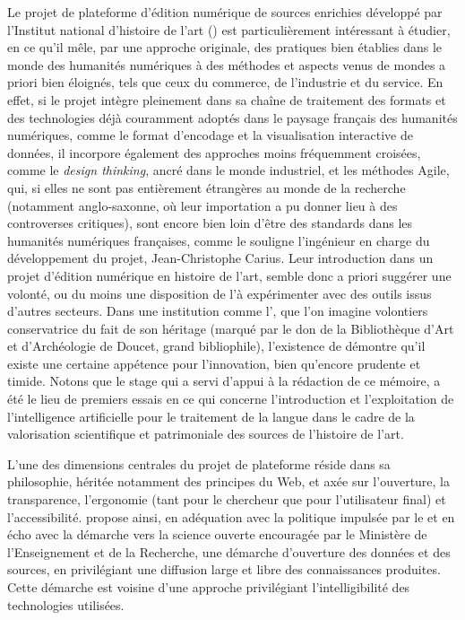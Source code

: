 Le projet de plateforme d’édition numérique de sources enrichies développé par l’Institut national d’histoire de l’art (\inha) est particulièrement intéressant à étudier, en ce qu’il mêle, par une approche originale, des pratiques bien établies dans le monde des humanités numériques à des méthodes et aspects venus de mondes a priori bien éloignés, tels que ceux du commerce, de l’industrie et du service. En effet, si le projet intègre pleinement dans sa chaîne de traitement des formats et des technologies déjà couramment adoptés dans le paysage français des humanités numériques, comme le format d’encodage \tei et la visualisation interactive de données, il incorpore également des approches moins fréquemment croisées, comme le \textit{design thinking}, ancré dans le monde industriel, et les méthodes Agile, qui, si elles ne sont pas entièrement étrangères au monde de la recherche (notamment anglo-saxonne, où leur importation a pu donner lieu à des controverses critiques), sont encore bien loin d’être des standards dans les humanités numériques françaises, comme le souligne l’ingénieur en charge du développement du projet, Jean-Christophe Carius. Leur introduction dans un projet d’édition numérique en histoire de l’art, semble donc a priori suggérer une volonté, ou du moins une disposition de l'\inha à expérimenter avec des outils issus d’autres secteurs. Dans une institution comme l’\inha, que l’on imagine volontiers conservatrice du fait de son héritage (marqué par le don de la Bibliothèque d’Art et d’Archéologie de Doucet, grand bibliophile), l’existence de \pense démontre qu’il existe une certaine appétence pour l’innovation, bien qu’encore prudente et timide. Notons que le stage qui a servi d’appui à la rédaction de ce mémoire, a été le lieu de premiers essais en ce qui concerne l’introduction et l’exploitation de l’intelligence artificielle pour le traitement de la langue dans le cadre de la valorisation scientifique et patrimoniale des sources de l’histoire de l’art. 

L’une des dimensions centrales du projet de plateforme \pense réside dans sa philosophie, héritée notamment des principes du Web, et axée sur l’ouverture, la transparence, l’ergonomie (tant pour le chercheur que pour l’utilisateur final) et l’accessibilité. \pense propose ainsi, en adéquation avec la politique impulsée par le \snr et en écho avec la démarche vers la science ouverte encouragée par le Ministère de l’Enseignement et de la Recherche, une démarche d’ouverture des données et des sources, en privilégiant une diffusion large et libre des connaissances produites. Cette démarche est voisine d’une approche privilégiant l’intelligibilité des technologies utilisées. 

